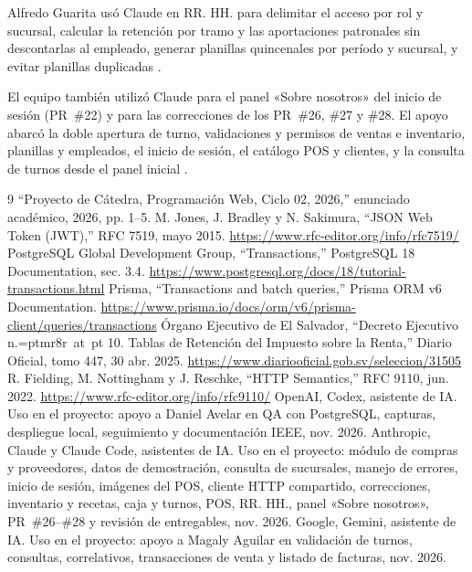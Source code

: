 \documentclass[conference,letterpaper]{IEEEtran}
\makeatletter
\newcommand{\numero}{n.\hbox{\font\ordinalfont=ptmr8r at \f@size pt\ordinalfont\char186}}
\makeatother
\begin{document}
Alfredo Guarita usó Claude en RR. HH. para delimitar el acceso por rol y sucursal, calcular la retención por tramo y las aportaciones patronales sin descontarlas al empleado, generar planillas quincenales por período y sucursal, y evitar planillas duplicadas \cite{claude}.

El equipo también utilizó Claude para el panel «Sobre nosotros» del inicio de sesión (PR~\#22) y para las correcciones de los PR~\#26, \#27 y \#28. El apoyo abarcó la doble apertura de turno, validaciones y permisos de ventas e inventario, planillas y empleados, el inicio de sesión, el catálogo POS y clientes, y la consulta de turnos desde el panel inicial \cite{claude}.


\begin{thebibliography}{9}
“Proyecto de Cátedra, Programación Web, Ciclo 02, 2026,” enunciado académico, 2026, pp. 1--5.
M. Jones, J. Bradley y N. Sakimura, “JSON Web Token (JWT),” RFC 7519, mayo 2015. \url{https://www.rfc-editor.org/info/rfc7519/}
PostgreSQL Global Development Group, “Transactions,” PostgreSQL 18 Documentation, sec. 3.4. \url{https://www.postgresql.org/docs/18/tutorial-transactions.html}
Prisma, “Transactions and batch queries,” Prisma ORM v6 Documentation. \url{https://www.prisma.io/docs/orm/v6/prisma-client/queries/transactions}
Órgano Ejecutivo de El Salvador, “Decreto Ejecutivo \numero{} 10. Tablas de Retención del Impuesto sobre la Renta,” Diario Oficial, tomo 447, 30 abr. 2025. \url{https://www.diariooficial.gob.sv/seleccion/31505}
R. Fielding, M. Nottingham y J. Reschke, “HTTP Semantics,” RFC 9110, jun. 2022. \url{https://www.rfc-editor.org/info/rfc9110/}
OpenAI, Codex, asistente de IA. Uso en el proyecto: apoyo a Daniel Avelar en QA con PostgreSQL, capturas, despliegue local, seguimiento y documentación IEEE, nov. 2026.
Anthropic, Claude y Claude Code, asistentes de IA. Uso en el proyecto: módulo de compras y proveedores, datos de demostración, consulta de sucursales, manejo de errores, inicio de sesión, imágenes del POS, cliente HTTP compartido, correcciones, inventario y recetas, caja y turnos, POS, RR. HH., panel «Sobre nosotros», PR~\#26--\#28 y revisión de entregables, nov. 2026.
Google, Gemini, asistente de IA. Uso en el proyecto: apoyo a Magaly Aguilar en validación de turnos, consultas, correlativos, transacciones de venta y listado de facturas, nov. 2026.
\end{thebibliography}
\end{document}
